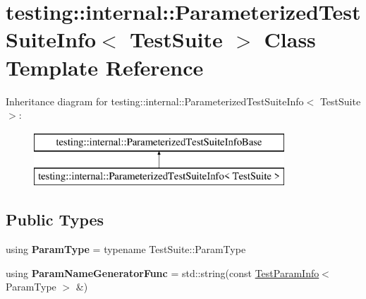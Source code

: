 \hypertarget{classtesting_1_1internal_1_1ParameterizedTestSuiteInfo}{}\section{testing\+:\+:internal\+:\+:Parameterized\+Test\+Suite\+Info$<$ Test\+Suite $>$ Class Template Reference}
\label{classtesting_1_1internal_1_1ParameterizedTestSuiteInfo}
Inheritance diagram for testing\+:\+:internal\+:\+:Parameterized\+Test\+Suite\+Info$<$ Test\+Suite $>$\+:\begin{figure}[H]
\begin{center}
\leavevmode
\includegraphics[height=2.000000cm]{classtesting_1_1internal_1_1ParameterizedTestSuiteInfo}
\end{center}
\end{figure}
\subsection*{Public Types}
\begin{DoxyCompactItemize}
\item 
\mbox{\label{classtesting_1_1internal_1_1ParameterizedTestSuiteInfo_a10761bd750a6820a8d8d2c654b10fe54}} 
using {\bfseries Param\+Type} = typename Test\+Suite\+::\+Param\+Type
\item 
\mbox{\label{classtesting_1_1internal_1_1ParameterizedTestSuiteInfo_a3b4f232b7d6d3df941bb8e81b6b534a4}} 
using {\bfseries Param\+Name\+Generator\+Func} = std\+::string(const \mbox{\hyperlink{structtesting_1_1TestParamInfo}{Test\+Param\+Info}}$<$ Param\+Type $>$ \&)
\end{DoxyCompactItemize}
